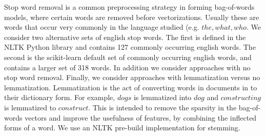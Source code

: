 \documentclass[conference]{IEEEtran}
\begin{document}
Stop word removal is a common preprocessing strategy in forming bag-of-words models, where certain words are removed before vectorizations. Usually these are words that occur very commonly in the language studied (e.g. $the, what, who$. We consider two alternative sets of english stop words. The first is defined in the NLTK \cite{nltk} Python library and contains 127 commonly occurring english words. The second is the scikit-learn \cite{scikit-learn} default set of commonly occurring english words, and contains a larger set of 318 words. In addition we consider approaches with no stop word removal. Finally, we consider approaches with lemmatization versus no lemmatization. Lemmatization is the act of converting words in documents in to their dictionary form. For example, $dogs$ is lemmatized into $dog$ and $constructing$ is lemmatized to $construct$. This is intended to remove the sparsity in the bag-of-words vectors and improve the usefulness of features, by combining the inflected forms of a word. We use an NLTK \cite{nltk} pre-build implementation for stemming.
\end{document}
